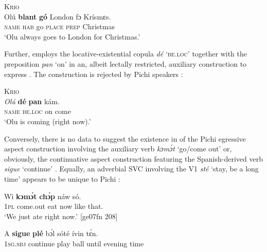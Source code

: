 \newpage 
\ea%
    \label{ex:1:12}
\textsc{Krio}\\
    \gll   Olú    \textbf{blant}  \textbf{gó}  London  fɔ  Krísmɛs.\\
\textsc{name}  \textsc{hab}    go  \textsc{place}  \textsc{prep}  Christmas\\

\glt ‘Olu always goes to London for Christmas.’  \citep[181]{YillahCorcoran2007}
\z

Further,  employs the locative-existential copula \textit{dé} \textsc{‘be.loc’} together with the preposition \textit{pan} ‘on’ in an, albeit lectally restricted, auxiliary construction to express  . The construction is rejected by Pichi speakers :


\ea%
    \label{ex:1:13}
\textsc{Krio}\\
    \gll   \textit{Olú}   \textbf{dé}   \textbf{pan}    kám.\\
\textsc{name}  \textsc{be.loc}  on    come\\

\glt ‘Olu is coming (right now).’ \citep[179]{YillahCorcoran2007}
\z


\z

Conversely, there is no data to suggest the existence in  of the Pichi egressive aspect construction involving the auxiliary verb \textit{kɔmɔ́t} ‘go/come out’  or, obviously, the continuative aspect construction featuring the Spanish-derived verb \textit{sigue} ‘continue’ . Equally, an adverbial SVC involving the V1 \textit{sté} ‘stay, be a long time’ appears to be unique to Pichi : 


\ea%
    \label{ex:1:15}
    \gll   Wì  \textbf{kɔmɔ́t}    \textbf{chɔ́p}  náw    só.\\
 \textsc{1pl}  come.out  eat    now    like that.\\
\glt ‘We just ate right now.’ [ge07fn 208]
\z


\ea%
    \label{ex:1:16}
    \gll   A    \textbf{sigue}    \textbf{plé}    bɔ́l  sóté    ívin    tɛ́n.\\
\textsc{1sg.sbj}  continue    play    ball  until  evening  time\\

